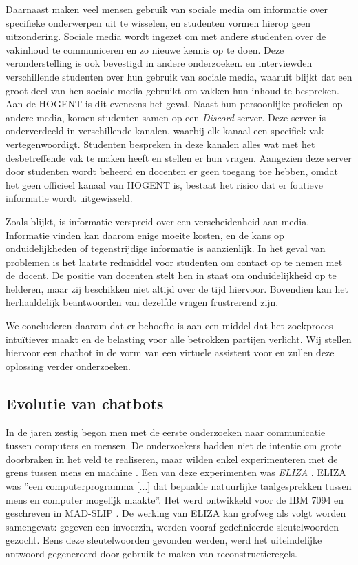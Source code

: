 Daarnaast maken veel mensen gebruik van sociale media om informatie over specifieke onderwerpen uit te wisselen, en studenten vormen hierop geen uitzondering. Sociale media wordt ingezet om met andere studenten over de vakinhoud te communiceren en zo nieuwe kennis op te doen. Deze veronderstelling is ook bevestigd in andere onderzoeken. \textcite{M.Talaue2018} en \textcite{Bal2017} interviewden verschillende studenten over hun gebruik van sociale media, waaruit blijkt dat een groot deel van hen sociale media gebruikt om vakken hun inhoud te bespreken. Aan de HOGENT is dit eveneens het geval. Naast hun persoonlijke profielen op andere media, komen studenten samen op een \textit{Discord}-server. Deze server is onderverdeeld in verschillende kanalen, waarbij elk kanaal een specifiek vak vertegenwoordigt. Studenten bespreken in deze kanalen alles wat met het desbetreffende vak te maken heeft en stellen er hun vragen. Aangezien deze server door studenten wordt beheerd en docenten er geen toegang toe hebben, omdat het geen officieel kanaal van HOGENT is, bestaat het risico dat er foutieve informatie wordt uitgewisseld. 

Zoals blijkt, is informatie verspreid over een verscheidenheid aan media. Informatie vinden kan daarom enige moeite kosten, en de kans op onduidelijkheden of tegenstrijdige informatie is aanzienlijk. In het geval van problemen is het laatste redmiddel voor studenten om contact op te nemen met de docent. De positie van docenten stelt hen in staat om onduidelijkheid op te helderen, maar zij beschikken niet altijd over de tijd hiervoor. Bovendien kan het herhaaldelijk beantwoorden van dezelfde vragen frustrerend zijn.

We concluderen daarom dat er behoefte is aan een middel dat het zoekproces intuïtiever maakt en de belasting voor alle betrokken partijen verlicht. Wij stellen hiervoor een chatbot in de vorm van een virtuele assistent voor en zullen deze oplossing verder onderzoeken.


\subsection{Evolutie van chatbots}
\label{sec:chatbots}

In de jaren zestig begon men met de eerste onderzoeken naar communicatie tussen computers en mensen. De onderzoekers hadden niet de intentie om grote doorbraken in het veld te realiseren, maar wilden enkel experimenteren met de grens tussen mens en machine \autocite{Dibitonto2018, AbuShawar2007}. Een van deze experimenten was \textit{ELIZA} \autocite{Weizenbaum1966}. ELIZA was ''een computerprogramma [...] dat bepaalde natuurlijke taalgesprekken tussen mens en computer mogelijk maakte''. Het werd ontwikkeld voor de IBM 7094 en geschreven in MAD-SLIP \autocite{Weizenbaum1966}. De werking van ELIZA kan grofweg als volgt worden samengevat: gegeven een invoerzin, werden vooraf gedefinieerde sleutelwoorden gezocht. Eens deze sleutelwoorden gevonden werden, werd het uiteindelijke antwoord gegenereerd door gebruik te maken van reconstructieregels. 

